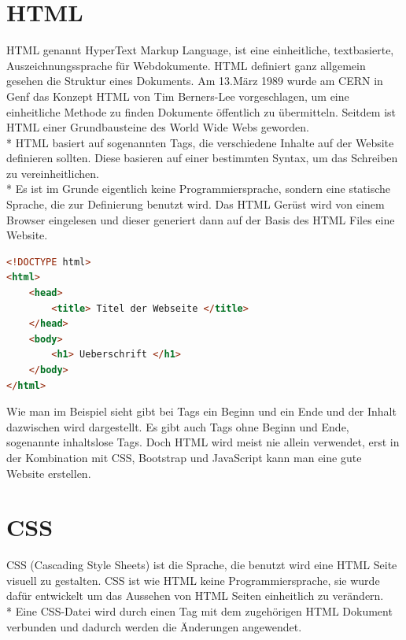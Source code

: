 \section{HTML}
\author{Benjamin Besic}
HTML genannt HyperText Markup Language, ist eine einheitliche, textbasierte, Auszeichnungssprache für Webdokumente. HTML definiert ganz allgemein gesehen die Struktur eines Dokuments. 
Am 13.März 1989 wurde am CERN in Genf das Konzept HTML von Tim Berners-Lee vorgeschlagen, um eine einheitliche Methode zu finden Dokumente öffentlich zu übermitteln. Seitdem ist HTML  einer Grundbausteine des World Wide Webs geworden. \\*
HTML basiert auf sogenannten Tags, die verschiedene Inhalte auf der Website definieren sollten. Diese basieren auf einer bestimmten Syntax, um das Schreiben zu vereinheitlichen. \\*
Es ist im Grunde eigentlich keine Programmiersprache, sondern eine statische Sprache, die zur Definierung benutzt wird. 
Das HTML Gerüst wird von einem Browser eingelesen und dieser generiert dann auf der Basis des HTML Files eine Website. \cite{HTMLTut} \cite{HTMLSeoKueche}

\begin{lstlisting}[language=HTML,caption=HTML File Grundgerüst,label=lst:impl:foo]
<!DOCTYPE html>
<html>
    <head>
        <title> Titel der Webseite </title>
    </head>
    <body>
        <h1> Ueberschrift </h1>
    </body>
</html>
\end{lstlisting}

Wie man im Beispiel sieht gibt bei Tags ein Beginn und ein Ende und der Inhalt dazwischen wird dargestellt.
Es gibt auch Tags ohne Beginn und Ende, sogenannte inhaltslose Tags.
Doch HTML wird meist nie allein verwendet, erst in der Kombination mit CSS, Bootstrap und JavaScript kann man eine gute Website erstellen.

\section{CSS}
\author{Benjamin Besic}
CSS (Cascading Style Sheets) ist die Sprache, die benutzt wird eine HTML Seite visuell zu gestalten. CSS ist wie HTML keine Programmiersprache, sie wurde dafür entwickelt um das Aussehen von HTML Seiten einheitlich zu verändern.\\*
Eine CSS-Datei wird durch einen Tag mit dem zugehörigen HTML Dokument verbunden und dadurch werden die Änderungen angewendet. \cite{CSSMozilla}

